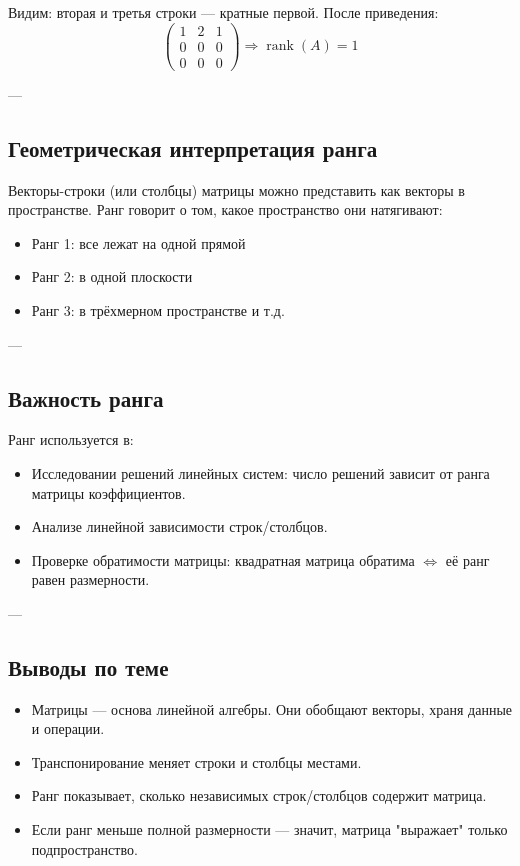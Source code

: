 Видим: вторая и третья строки — кратные первой. После приведения:
\[
\begin{pmatrix}
1 & 2 & 1 \\
0 & 0 & 0 \\
0 & 0 & 0
\end{pmatrix}
\Rightarrow \operatorname{rank}(A) = 1
\]

---

\subsection*{Геометрическая интерпретация ранга}

Векторы-строки (или столбцы) матрицы можно представить как векторы в пространстве. Ранг говорит о том, какое пространство они натягивают:
\begin{itemize}
  \item Ранг 1: все лежат на одной прямой
  \item Ранг 2: в одной плоскости
  \item Ранг 3: в трёхмерном пространстве и т.д.
\end{itemize}

---

\subsection*{Важность ранга}

Ранг используется в:
\begin{itemize}
  \item Исследовании решений линейных систем: число решений зависит от ранга матрицы коэффициентов.
  \item Анализе линейной зависимости строк/столбцов.
  \item Проверке обратимости матрицы: квадратная матрица обратима $\iff$ её ранг равен размерности.
\end{itemize}

---

\subsection*{Выводы по теме}

\begin{itemize}
  \item Матрицы — основа линейной алгебры. Они обобщают векторы, храня данные и операции.
  \item Транспонирование меняет строки и столбцы местами.
  \item Ранг показывает, сколько независимых строк/столбцов содержит матрица.
  \item Если ранг меньше полной размерности — значит, матрица "выражает" только подпространство.
\end{itemize}
